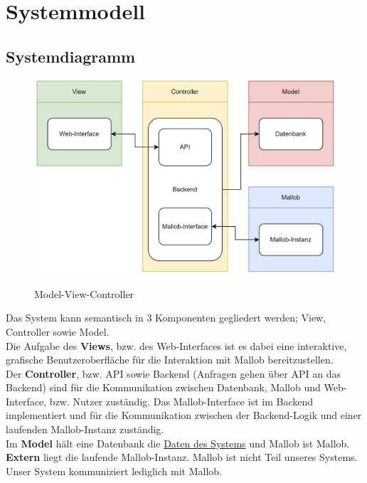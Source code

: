 \section{Systemmodell}

\subsection{Systemdiagramm}

\begin{figure}[H]
    \centering
    \includegraphics[width=\textwidth]{images-interface/Diagramme/Systemdiagramm3.jpg} \\
    \caption{\gls{Model-View-Controller}}
\end{figure}
Das System kann semantisch in 3 Komponenten gegliedert werden; View, Controller sowie Model. \\
Die Aufgabe des \textbf{Views}, bzw. des Web-Interfaces ist es dabei eine interaktive, grafische Benutzeroberfläche für die Interaktion mit Mallob bereitzustellen. \\
Der \textbf{Controller}, bzw. \gls{API} sowie Backend (Anfragen gehen über \gls{API} an das Backend) sind für die Kommunikation zwischen \gls{Datenbank}, Mallob und Web-Interface, bzw. \gls{Nutzer} zuständig. Das Mallob-Interface ist im Backend implementiert und für die Kommunikation zwischen der Backend-Logik und einer laufenden Mallob-Instanz zuständig.\\
Im \textbf{Model} hält eine \gls{Datenbank} die \hyperref[PD]{Daten des Systems} und Mallob ist Mallob. \\
\textbf{Extern} liegt die laufende Mallob-Instanz. Mallob ist nicht Teil unseres Systems. Unser System kommuniziert lediglich mit Mallob.

